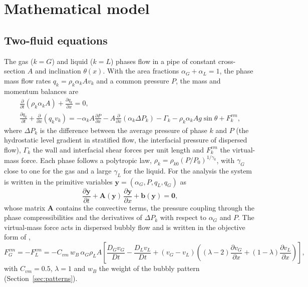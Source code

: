 \documentclass[a4paper,fleqn]{cas-sc}
\newcommand{\pd}[2]{\frac{\partial #1}{\partial #2}}
\newcommand{\aG}{\alpha_G}
\newcommand{\aL}{\alpha_L}
\newcommand{\by}{\mathbf{y}}
\newcommand{\bA}{\mathbf{A}}
\begin{document}
\section{Mathematical model}\label{sec:model}

\subsection{Two-fluid equations}\label{sec:equations}

The gas ($k = G$) and liquid ($k = L$) phases flow in a pipe of constant cross-section $A$ and inclination $\theta(x)$. With the area fractions $\aG + \aL = 1$, the phase mass flow rates $q_k = \rho_k \alpha_k A v_k$ and a common pressure $P$, the mass and momentum balances are
\begin{gather}
\pd{}{t}\left(\rho_k \alpha_k A\right) + \pd{q_k}{x} = 0, \label{eq:mass}\\
\pd{q_k}{t} + \pd{}{x}\left(q_k v_k\right) = -\alpha_k A \pd{P}{x} - A\pd{}{x}\left(\alpha_k \Delta P_k\right) - \Gamma_k - \rho_k \alpha_k A g \sin\theta + F^{vm}_k, \label{eq:momentum}
\end{gather}
where $\Delta P_k$ is the difference between the average pressure of phase $k$ and $P$ (the hydrostatic level gradient in stratified flow, the interfacial pressure of dispersed flow), $\Gamma_k$ the wall and interfacial shear forces per unit length and $F^{vm}_k$ the virtual-mass force. Each phase follows a polytropic law, $\rho_k = \rho_{k0}(P/P_0)^{1/\gamma_k}$, with $\gamma_G$ close to one for the gas and a large $\gamma_L$ for the liquid. For the analysis the system is written in the primitive variables $\by = (\aG, P, q_L, q_G)$ as
\begin{equation}\label{eq:quasilinear}
\pd{\by}{t} + \bA(\by)\,\pd{\by}{x} + \mathbf{b}(\by) = \mathbf{0},
\end{equation}
whose matrix $\bA$ contains the convective terms, the pressure coupling through the phase compressibilities and the derivatives of $\Delta P_k$ with respect to $\aG$ and $P$. The virtual-mass force acts in dispersed bubbly flow and is written in the objective form of \citet{drew1979},
\begin{equation}\label{eq:vm}
F^{vm}_G = -F^{vm}_L = -C_{vm}\, w_B\, \aG \rho_L A \left[\frac{D_G v_G}{Dt} - \frac{D_L v_L}{Dt} + (v_G - v_L)\left((\lambda - 2)\pd{v_G}{x} + (1 - \lambda)\pd{v_L}{x}\right)\right],
\end{equation}
with $C_{vm} = 0.5$, $\lambda = 1$ and $w_B$ the weight of the bubbly pattern (Section~\ref{sec:patterns}).
\end{document}
